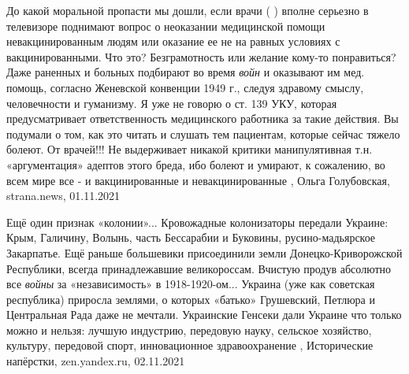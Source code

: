 До какой моральной пропасти мы дошли, если врачи ( ) вполне серьезно в
телевизоре поднимают вопрос о неоказании медицинской помощи невакцинированным
людям или оказание ее не на равных условиях с вакцинированными. Что это?
Безграмотность или желание кому-то понравиться?  Даже раненных и больных
подбирают во время \emph{войн} и оказывают им мед. помощь, согласно Женевской
конвенции 1949 г., следуя здравому смыслу, человечности и гуманизму. Я уже не
говорю о ст. 139 УКУ, которая предусматривает ответственность медицинского
работника за такие действия. Вы подумали о том, как это читать и слушать тем
пациентам, которые сейчас тяжело болеют. От врачей!!!  Не выдерживает никакой
критики манипулятивная т.н. «аргументация» адептов этого бреда, ибо болеют и
умирают, к сожалению, во всем мире все - и вакцинированные и невакцинированные
, 
Ольга Голубовская, strana.news, 01.11.2021

Ещё один признак «колонии»... Кровожадные колонизаторы передали Украине: Крым,
Галичину, Волынь, часть Бессарабии и Буковины, русино-мадьярское Закарпатье.
Ещё раньше большевики присоединили земли Донецко-Криворожской Республики,
всегда принадлежавшие великороссам. Вчистую продув абсолютно все \emph{войны} за
«независимость» в 1918-1920-ом... Украина (уже как советская республика)
приросла землями, о которых «батько» Грушевский, Петлюра и Центральная Рада
даже не мечтали.  Украинские Генсеки дали Украине что только можно и нельзя:
лучшую индустрию, передовую науку, сельское хозяйство, культуру, передовой
спорт, инновационное здравоохранение
, 
Исторические напёрстки, zen.yandex.ru, 02.11.2021
